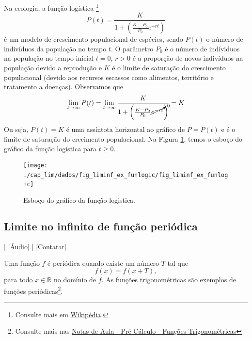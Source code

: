 \begin{ex}
  Na ecologia, a função logística \footnote{Consulte mais em \href{https://pt.wikipedia.org/wiki/Fun\%C3\%A7\%C3\%A3o_log\%C3\%ADstica}{Wikipédia}.}
    \begin{equation}
      P(t) = \frac{K}{1 + \left(\frac{K-P_0}{P_0}e^{-rt}\right)}
    \end{equation}
    é um modelo de crescimento populacional de espécies, sendo $P(t)$ o número de indivíduos da população no tempo $t$. O parâmetro $P_0$ é o número de indíviduos na população no tempo inicial $t=0$, $r>0$ é a proporção de novos indivíduos na população devido a reprodução e $K$ é o limite de saturação do crescimento populacional (devido aos recursos escassos como alimentos, território e tratamento a doenças). Observamos que
    \begin{equation}
      \lim_{t\to\infty} P(t) = \lim_{t\to\infty} \frac{K}{1 + \left(\frac{K-P_0}{P_0}\cancelto{0}{e^{-rt}}\right)} = K
    \end{equation}
    Ou seja, $P(t) = K$ é uma assíntota horizontal ao gráfico de $P = P(t)$ e é o limite de saturação do crecimento populacional. Na Figura \ref{fig:liminf_ex_funlogic}, temos o esboço do gráfico da função logística para $t\geq 0$.

    \begin{figure}[H]
      \centering
      \texttt{[image: ./cap\_lim/dados/fig\_liminf\_ex\_funlogic/fig\_liminf\_ex\_funlogic]}
      \caption{Esboço do gráfico da função logistica.}
      \label{fig:liminf_ex_funlogic}
    \end{figure}
\end{ex}

\subsection{Limite no infinito de função periódica}

\begin{flushright}
  [Vídeo] | [Áudio] | \href{https://phkonzen.github.io/notas/contato.html}{[Contatar]}
\end{flushright}

Uma função $f$ é periódica quando existe um número $T$ tal que
\begin{equation}
  f(x) = f(x+T),
\end{equation}
para todo $x\in\mathbb{R}$ no domínio de $f$. As funções trigonométricas são exemplos de funções periódicas\footnote{Consulte mais nas \href{https://phkonzen.github.io/notas/PreCalculo/cap\_funcao\_sec\_funtri.html}{Notas de Aula - Pré-Cálculo - Funções Trigonométricas}}.

